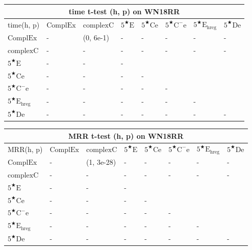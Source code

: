 \documentclass[11pt]{article}
\begin{document}
\begin{table}
\begin{tabular}{llllllll}
    \hline
    \multicolumn{8}{c}{time t-test (h, p) on WN18RR}\\
    \hline
    time(h, p) & $\mathrm{ComplEx}$ & $\mathrm{complexC}$ & $5^{\bigstar}\mathrm{E}$ & $5^{\bigstar}\mathrm{Ce}$ & $5^{\bigstar}\mathrm{C^{-}e}$ & $5^{\bigstar}\mathrm{E_{hreg}}$ & $5^{\bigstar}\mathrm{De}$\\
    $\mathrm{ComplEx}$ & - & (0, 6e-1) & - & - & - & - & - \\
    $\mathrm{complexC}$ & - & - & - & - & - & - & - \\
    $5^{\bigstar}\mathrm{E}$ & - & - & -\\
    $5^{\bigstar}\mathrm{Ce}$ & - & - & - & -\\
    $5^{\bigstar}\mathrm{C^{-}e}$ & - & - & - & - & -\\
    $5^{\bigstar}\mathrm{E_{hreg}}$ & - & - & - & - & - & -\\
    $5^{\bigstar}\mathrm{De}$ & - & - & - & - & - & - & -\\
    \hline
\end{tabular}
\begin{tabular}{llllllll}
    \hline
    \multicolumn{8}{c}{MRR t-test (h, p) on WN18RR}\\
    \hline
    MRR(h, p) & $\mathrm{ComplEx}$ & $\mathrm{complexC}$ & $5^{\bigstar}\mathrm{E}$ & $5^{\bigstar}\mathrm{Ce}$ & $5^{\bigstar}\mathrm{C^{-}e}$ & $5^{\bigstar}\mathrm{E_{hreg}}$ & $5^{\bigstar}\mathrm{De}$\\
    $\mathrm{ComplEx}$ & - & (1, 3e-28) & - & - & - & - & - \\
    $\mathrm{complexC}$ & - & - & - & - & - & - & - \\
    $5^{\bigstar}\mathrm{E}$ & - & - & -\\
    $5^{\bigstar}\mathrm{Ce}$ & - & - & - & -\\
    $5^{\bigstar}\mathrm{C^{-}e}$ & - & - & - & - & -\\
    $5^{\bigstar}\mathrm{E_{hreg}}$ & - & - & - & - & - & -\\
    $5^{\bigstar}\mathrm{De}$ & - & - & - & - & - & - & -\\
    \hline
\end{tabular}


\end{table}
\end{document}
